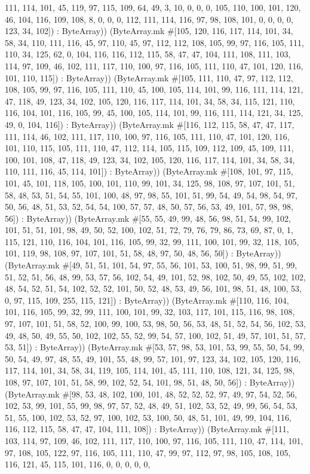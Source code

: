 \documentclass[11pt]{article}
\begin{document}
111, 114, 101, 45, 119, 97, 115, 109, 64, 49, 3, 10, 0, 0, 0, 105, 110, 100, 101, 120, 46, 104, 116, 109, 108, 8, 0, 0, 0, 112, 111, 114, 116, 97, 98, 108, 101, 0, 0, 0, 0, 123, 34, 102]) : ByteArray)) (ByteArray.mk \#[105, 120, 116, 117, 114, 101, 34, 58, 34, 110, 111, 116, 45, 97, 110, 45, 97, 112, 112, 108, 105, 99, 97, 116, 105, 111, 110, 34, 125, 62, 0, 104, 116, 116, 112, 115, 58, 47, 47, 104, 111, 108, 111, 103, 114, 97, 109, 46, 102, 111, 117, 110, 100, 97, 116, 105, 111, 110, 47, 101, 120, 116, 101, 110, 115]) : ByteArray)) (ByteArray.mk \#[105, 111, 110, 47, 97, 112, 112, 108, 105, 99, 97, 116, 105, 111, 110, 45, 100, 105, 114, 101, 99, 116, 111, 114, 121, 47, 118, 49, 123, 34, 102, 105, 120, 116, 117, 114, 101, 34, 58, 34, 115, 121, 110, 116, 104, 101, 116, 105, 99, 45, 100, 105, 114, 101, 99, 116, 111, 114, 121, 34, 125, 49, 0, 104, 116]) : ByteArray)) (ByteArray.mk \#[116, 112, 115, 58, 47, 47, 117, 111, 114, 46, 102, 111, 117, 110, 100, 97, 116, 105, 111, 110, 47, 101, 120, 116, 101, 110, 115, 105, 111, 110, 47, 112, 114, 105, 115, 109, 112, 109, 45, 109, 111, 100, 101, 108, 47, 118, 49, 123, 34, 102, 105, 120, 116, 117, 114, 101, 34, 58, 34, 110, 111, 116, 45, 114, 101]) : ByteArray)) (ByteArray.mk \#[108, 101, 97, 115, 101, 45, 101, 118, 105, 100, 101, 110, 99, 101, 34, 125, 98, 108, 97, 107, 101, 51, 58, 48, 53, 51, 54, 55, 101, 100, 48, 97, 98, 55, 101, 51, 99, 54, 49, 54, 98, 54, 97, 50, 56, 48, 51, 53, 52, 54, 54, 100, 57, 57, 48, 50, 57, 56, 53, 49, 101, 57, 98, 98, 56]) : ByteArray)) (ByteArray.mk \#[55, 55, 49, 99, 48, 56, 98, 51, 54, 99, 102, 101, 51, 51, 101, 98, 49, 50, 52, 100, 102, 51, 72, 79, 76, 79, 86, 73, 69, 87, 0, 1, 115, 121, 110, 116, 104, 101, 116, 105, 99, 32, 99, 111, 100, 101, 99, 32, 118, 105, 101, 119, 98, 108, 97, 107, 101, 51, 58, 48, 97, 50, 48, 56, 50]) : ByteArray)) (ByteArray.mk \#[49, 51, 51, 101, 54, 97, 55, 56, 101, 53, 100, 51, 98, 99, 51, 99, 51, 52, 51, 56, 48, 99, 53, 57, 56, 102, 54, 49, 101, 52, 98, 102, 50, 49, 55, 102, 102, 48, 54, 52, 51, 54, 102, 52, 52, 101, 50, 52, 48, 53, 49, 56, 101, 98, 51, 48, 100, 53, 0, 97, 115, 109, 255, 115, 121]) : ByteArray)) (ByteArray.mk \#[110, 116, 104, 101, 116, 105, 99, 32, 99, 111, 100, 101, 99, 32, 103, 117, 101, 115, 116, 98, 108, 97, 107, 101, 51, 58, 52, 100, 99, 100, 53, 98, 50, 56, 53, 48, 51, 52, 54, 56, 102, 53, 49, 48, 50, 49, 55, 50, 102, 102, 55, 52, 99, 54, 57, 100, 102, 51, 49, 57, 101, 51, 57, 53, 51]) : ByteArray)) (ByteArray.mk \#[53, 57, 98, 53, 101, 53, 99, 55, 50, 54, 99, 50, 54, 49, 97, 48, 55, 49, 101, 55, 48, 99, 57, 101, 97, 123, 34, 102, 105, 120, 116, 117, 114, 101, 34, 58, 34, 119, 105, 114, 101, 45, 111, 110, 108, 121, 34, 125, 98, 108, 97, 107, 101, 51, 58, 99, 102, 52, 54, 101, 98, 51, 48, 50, 56]) : ByteArray)) (ByteArray.mk \#[98, 53, 48, 102, 100, 101, 48, 52, 52, 52, 97, 49, 97, 54, 52, 56, 102, 53, 99, 101, 55, 99, 98, 97, 57, 52, 48, 49, 51, 102, 53, 52, 49, 99, 56, 54, 53, 51, 55, 100, 102, 53, 52, 97, 100, 102, 53, 100, 50, 48, 51, 101, 49, 99, 104, 116, 116, 112, 115, 58, 47, 47, 104, 111, 108]) : ByteArray)) (ByteArray.mk \#[111, 103, 114, 97, 109, 46, 102, 111, 117, 110, 100, 97, 116, 105, 111, 110, 47, 114, 101, 97, 108, 105, 122, 97, 116, 105, 111, 110, 47, 99, 97, 112, 97, 98, 105, 108, 105, 116, 121, 45, 115, 101, 116, 0, 0, 0, 0, 0, 
\end{document}

